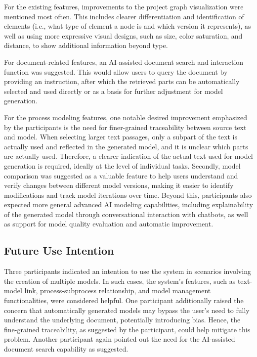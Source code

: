 For the existing features, improvements to the project graph visualization were mentioned most often. This includes clearer differentiation and identification of elements (i.e., what type of element a node is and which version it represents), as well as using more expressive visual designs, such as size, color saturation, and distance, to show additional information beyond type.

For document-related features, an AI-assisted document search and interaction function was suggested. This would allow users to query the document by providing an instruction, after which the retrieved parts can be automatically selected and used directly or as a basis for further adjustment for model generation.

For the process modeling features, one notable desired improvement emphasized by the participants is the need for finer-grained traceability between source text and model. When selecting larger text passages, only a subpart of the text is actually used and reflected in the generated model, and it is unclear which parts are actually used. Therefore, a clearer indication of the actual text used for model generation is required, ideally at the level of individual tasks. Secondly, model comparison was suggested as a valuable feature to help users understand and verify changes between different model versions, making it easier to identify modifications and track model iterations over time. Beyond this, participants also expected more general advanced AI modeling capabilities, including explainability of the generated model through conversational interaction with chatbots, as well as support for model quality evaluation and automatic improvement.

\subsection{Future Use Intention}
Three participants indicated an intention to use the system in scenarios involving the creation of multiple models. In such cases, the system’s features, such as text-model link, process-subprocess relationship, and model management functionalities, were considered helpful. One participant additionally raised the concern that automatically generated models may bypass the user’s need to fully understand the underlying document, potentially introducing bias. Hence, the fine-grained traceability, as suggested by the participant, could help mitigate this problem. Another participant again pointed out the need for the AI-assisted document search capability as suggested.



